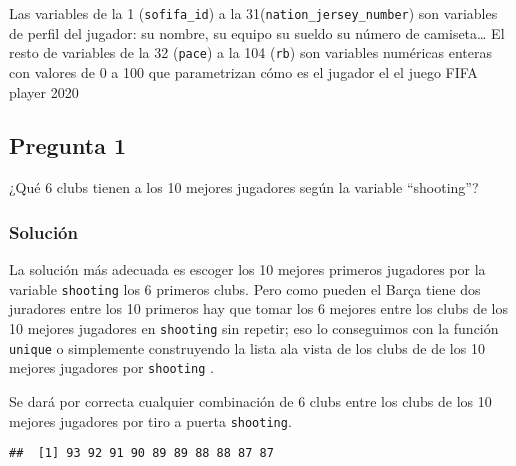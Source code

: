 \documentclass[
]{article}
\newenvironment{Shaded}{\begin{snugshade}}{\end{snugshade}}
\newcommand{\DataTypeTok}[1]{\textcolor[rgb]{0.13,0.29,0.53}{#1}}
\newcommand{\DecValTok}[1]{\textcolor[rgb]{0.00,0.00,0.81}{#1}}
\newcommand{\KeywordTok}[1]{\textcolor[rgb]{0.13,0.29,0.53}{\textbf{#1}}}
\newcommand{\NormalTok}[1]{#1}
\newcommand{\OperatorTok}[1]{\textcolor[rgb]{0.81,0.36,0.00}{\textbf{#1}}}
\newcommand{\OtherTok}[1]{\textcolor[rgb]{0.56,0.35,0.01}{#1}}
\begin{document}
Las variables de la 1 (\texttt{sofifa\_id}) a la
31(\texttt{nation\_jersey\_number}) son variables de perfil del jugador:
su nombre, su equipo su sueldo su número de camiseta\ldots{} El resto de
variables de la 32 (\texttt{pace}) a la 104 (\texttt{rb}) son variables
numéricas enteras con valores de 0 a 100 que parametrizan cómo es el
jugador el el juego FIFA player 2020

\hypertarget{pregunta-1}{%
\subsection{Pregunta 1}\label{pregunta-1}}

¿Qué 6 clubs tienen a los 10 mejores jugadores según la variable
``shooting''?

\hypertarget{soluciuxf3n-1}{%
\subsubsection{Solución}\label{soluciuxf3n-1}}

La solución más adecuada es escoger los 10 mejores primeros jugadores
por la variable \texttt{shooting} los 6 primeros clubs. Pero como pueden
el Barça tiene dos juradores entre los 10 primeros hay que tomar los 6
mejores entre los clubs de los 10 mejores jugadores en \texttt{shooting}
sin repetir; eso lo conseguimos con la función \texttt{unique} o
simplemente construyendo la lista ala vista de los clubs de de los 10
mejores jugadores por \texttt{shooting} .

Se dará por correcta cualquier combinación de 6 clubs entre los clubs de
los 10 mejores jugadores por tiro a puerta \texttt{shooting}.

\begin{Shaded}
\end{Shaded}

\begin{verbatim}
##  [1] 93 92 91 90 89 89 88 88 87 87
\end{verbatim}

\begin{Shaded}
\end{Shaded}
\end{document}

